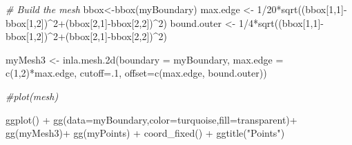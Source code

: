 \documentclass[
]{article}
\newenvironment{Shaded}{\begin{snugshade}}{\end{snugshade}}
\newcommand{\AttributeTok}[1]{\textcolor[rgb]{0.77,0.63,0.00}{#1}}
\newcommand{\CommentTok}[1]{\textcolor[rgb]{0.56,0.35,0.01}{\textit{#1}}}
\newcommand{\DecValTok}[1]{\textcolor[rgb]{0.00,0.00,0.81}{#1}}
\newcommand{\FunctionTok}[1]{\textcolor[rgb]{0.00,0.00,0.00}{#1}}
\newcommand{\NormalTok}[1]{#1}
\newcommand{\OtherTok}[1]{\textcolor[rgb]{0.56,0.35,0.01}{#1}}
\newcommand{\SpecialCharTok}[1]{\textcolor[rgb]{0.00,0.00,0.00}{#1}}
\newcommand{\StringTok}[1]{\textcolor[rgb]{0.31,0.60,0.02}{#1}}
\begin{document}
\begin{Shaded}
\begin{Highlighting}[]
\CommentTok{\# Build the mesh}
\NormalTok{bbox}\OtherTok{\textless{}{-}}\FunctionTok{bbox}\NormalTok{(myBoundary)}
\NormalTok{max.edge }\OtherTok{\textless{}{-}} \DecValTok{1}\SpecialCharTok{/}\DecValTok{20}\SpecialCharTok{*}\FunctionTok{sqrt}\NormalTok{((bbox[}\DecValTok{1}\NormalTok{,}\DecValTok{1}\NormalTok{]}\SpecialCharTok{{-}}\NormalTok{bbox[}\DecValTok{1}\NormalTok{,}\DecValTok{2}\NormalTok{])}\SpecialCharTok{\^{}}\DecValTok{2}\SpecialCharTok{+}\NormalTok{(bbox[}\DecValTok{2}\NormalTok{,}\DecValTok{1}\NormalTok{]}\SpecialCharTok{{-}}\NormalTok{bbox[}\DecValTok{2}\NormalTok{,}\DecValTok{2}\NormalTok{])}\SpecialCharTok{\^{}}\DecValTok{2}\NormalTok{)}
\NormalTok{bound.outer }\OtherTok{\textless{}{-}} \DecValTok{1}\SpecialCharTok{/}\DecValTok{4}\SpecialCharTok{*}\FunctionTok{sqrt}\NormalTok{((bbox[}\DecValTok{1}\NormalTok{,}\DecValTok{1}\NormalTok{]}\SpecialCharTok{{-}}\NormalTok{bbox[}\DecValTok{1}\NormalTok{,}\DecValTok{2}\NormalTok{])}\SpecialCharTok{\^{}}\DecValTok{2}\SpecialCharTok{+}\NormalTok{(bbox[}\DecValTok{2}\NormalTok{,}\DecValTok{1}\NormalTok{]}\SpecialCharTok{{-}}\NormalTok{bbox[}\DecValTok{2}\NormalTok{,}\DecValTok{2}\NormalTok{])}\SpecialCharTok{\^{}}\DecValTok{2}\NormalTok{)}

\NormalTok{myMesh3 }\OtherTok{\textless{}{-}} \FunctionTok{inla.mesh.2d}\NormalTok{(}\AttributeTok{boundary =}\NormalTok{ myBoundary,}
                    \AttributeTok{max.edge =} \FunctionTok{c}\NormalTok{(}\DecValTok{1}\NormalTok{,}\DecValTok{2}\NormalTok{)}\SpecialCharTok{*}\NormalTok{max.edge,}
                    \AttributeTok{cutoff=}\NormalTok{.}\DecValTok{1}\NormalTok{,}
                    \AttributeTok{offset=}\FunctionTok{c}\NormalTok{(max.edge, bound.outer))}

\CommentTok{\#plot(mesh)}

\FunctionTok{ggplot}\NormalTok{() }\SpecialCharTok{+}
     \FunctionTok{gg}\NormalTok{(}\AttributeTok{data=}\NormalTok{myBoundary,}\AttributeTok{color=}\StringTok{\textquotesingle{}turquoise\textquotesingle{}}\NormalTok{,}\AttributeTok{fill=}\StringTok{\textquotesingle{}transparent\textquotesingle{}}\NormalTok{)}\SpecialCharTok{+}  
  \FunctionTok{gg}\NormalTok{(myMesh3)}\SpecialCharTok{+}
  \FunctionTok{gg}\NormalTok{(myPoints) }\SpecialCharTok{+}
  \FunctionTok{coord\_fixed}\NormalTok{() }\SpecialCharTok{+}
  \FunctionTok{ggtitle}\NormalTok{(}\StringTok{"Points"}\NormalTok{)}
\end{Highlighting}
\end{Shaded}
\end{document}
